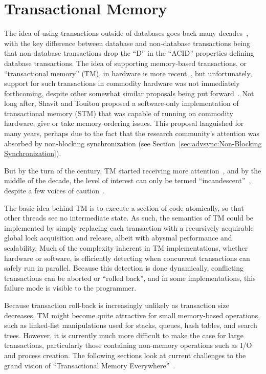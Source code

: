 
\section{Transactional Memory}
\label{sec:future:Transactional Memory}

The idea of using transactions outside of databases goes back many
decades~\cite{DBLomet1977SIGSOFT}, with the key difference between
database and non-database transactions being that non-database transactions
drop the ``D'' in the ``ACID'' properties defining database transactions.
The idea of supporting memory-based transactions, or ``transactional memory''
(TM), in hardware
is more recent~\cite{Herlihy93a}, but unfortunately, support for such
transactions in commodity hardware was not immediately forthcoming,
despite other somewhat similar proposals being put forward~\cite{JMStone93}.
Not long after, Shavit and Touitou proposed a software-only implementation
of transactional memory (STM) that was capable of running on commodity
hardware, give or take memory-ordering issues.
This proposal languished for many years, perhaps due to the fact that
the research community's attention was absorbed by non-blocking
synchronization (see Section~\ref{sec:advsync:Non-Blocking Synchronization}).

But by the turn of the century, TM started receiving
more attention~\cite{Martinez01a,Rajwar01a}, and by the middle of the
decade, the level of interest can only be termed
``incandescent''~\cite{MauriceHerlihy2005-TM-manifesto.pldi,
DanGrossman2007TMGCAnalogy}, despite a few voices of
caution~\cite{Blundell2005DebunkTM,McKenney2007PLOSTM}.

The basic idea behind TM is to execute a section of
code atomically, so that other threads see no intermediate state.
As such, the semantics of TM could be implemented
by simply replacing each transaction with a recursively acquirable
global lock acquisition and release, albeit with abysmal performance
and scalability.
Much of the complexity inherent in TM implementations, whether hardware
or software, is efficiently detecting when concurrent transactions can safely
run in parallel.
Because this detection is done dynamically, conflicting transactions
can be aborted or ``rolled back'', and in some implementations, this
failure mode is visible to the programmer.

Because transaction roll-back is increasingly unlikely as transaction
size decreases, TM might become quite attractive for small memory-based
operations,
such as linked-list manipulations used for stacks, queues, hash tables,
and search trees.
However, it is currently much more difficult to make the case for large
transactions, particularly those containing non-memory operations such
as I/O and process creation.
The following sections look at current challenges to the grand vision of
``Transactional Memory Everywhere''~\cite{PaulEMcKenney2009TMeverywhere}.

